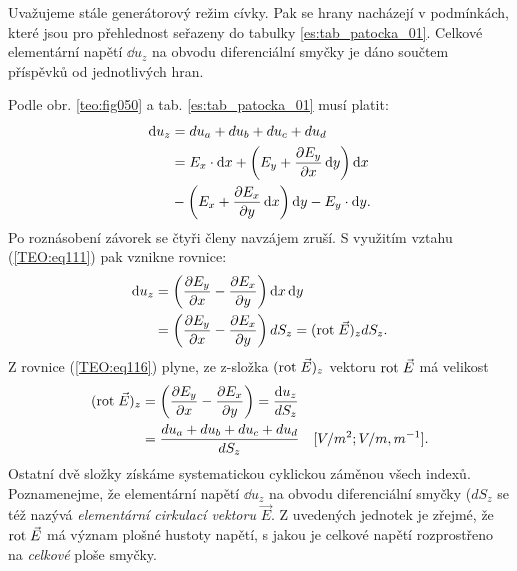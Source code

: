         Uvažujeme stále generátorový režim cívky. Pak se hrany nacházejí v podmínkách, které jsou 
        pro přehlednost seřazeny do tabulky \ref{es:tab_patocka_01}. Celkové elementární napětí 
        \(\dd{u_z}\) na obvodu diferenciální smyčky je dáno součtem příspěvků od jednotlivých hran.
        
        Podle obr. \ref{teo:fig050} a tab. \ref{es:tab_patocka_01} musí platit:
        \begin{align*}
          \mathop{}\!\mathrm{d}u_z &= du_a + du_b + du_c + du_d                                            \\ 
               &= E_x\cdot\mathop{}\!\mathrm{d}x + \left(E_y + \dfrac{\partial E_y}{\partial x}\mathop{}\!\mathrm{d}y\right)\mathop{}\!\mathrm{d}x        \\
               &- \left(E_x+\dfrac{\partial E_x}{\partial y}\mathop{}\!\mathrm{d}x\right)\mathop{}\!\mathrm{d}y-E_y\cdot \mathop{}\!\mathrm{d}y. 
        \end{align*}
        Po roznásobení závorek se čtyři členy navzájem zruší. S využitím vztahu 
        (\ref{TEO:eq111}) pak vznikne rovnice:
        \begin{align}
          \mathop{}\!\mathrm{d}u_z&= \left(\dfrac{\partial E_y}{\partial x} - \dfrac{\partial E_x}{\partial y}\right)\mathop{}\!\mathrm{d}x\mathop{}\!\mathrm{d}y              \nonumber \\
              &= \left(\dfrac{\partial E_y}{\partial x} - \dfrac{\partial E_x}{\partial y}\right)dS_z 
               = (\mathrm{rot}\;\vec{E})_z dS_z.                                   \label{TEO:eq116}
        \end{align}
        Z rovnice (\ref{TEO:eq116}) plyne, ze z-složka \((\mathrm{rot}\;\vec{E})_z\) vektoru \(\mathrm{rot}\;\vec{E}\) 
        má velikost
        \begin{align}
          (\mathrm{rot}\;\vec{E})_z &= \left(\dfrac{\partial E_y}{\partial x} - \dfrac{\partial E_x}{\partial y}\right)        
                       = \frac{\mathop{}\!\mathrm{d}u_z}{dS_z}                         \nonumber  \\
                      &= \frac{du_a + du_b + du_c + du_d}{dS_z} 
                         \quad[V/m^2; V/m, m^{-1}].                    \label{TEO:eq117}
        \end{align}
        Ostatní dvě složky získáme systematickou cyklickou záměnou všech indexů. Poznamenejme, že 
        elementární napětí \(\dd{u_z}\) na obvodu diferenciální smyčky (\(dS_z\) se též nazývá 
        \emph{elementární cirkulací vektoru} \(\vec{E}\). Z uvedených jednotek je zřejmé, že 
        \(\mathrm{rot}\;\vec{E}\) má význam plošné hustoty napětí, s jakou je celkové napětí rozprostřeno na 
        \emph{celkové} ploše smyčky.
      
